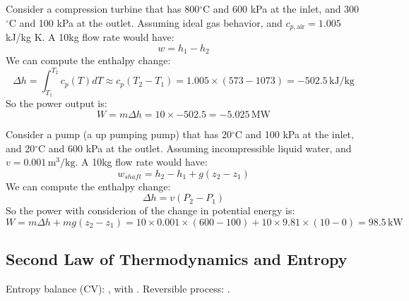 \documentclass[11pt]{report}
\begin{document}
\begin{example}
    Consider a compression turbine that has 800$^\circ$C and 600 kPa at the inlet, and 300$^\circ$C and 100 kPa at the outlet. Assuming ideal gas behavior, and $c_{p, \text{air}} = 1.005$ kJ/kg K. A 10kg flow rate would have:
    $$
        w = h_1 - h_2 
    $$
    We can compute the enthalpy change:
    $$
        \Delta h = \int_{T_1}^{T_2} c_p(T) dT \approx c_p (T_2 - T_1) = 1.005 \times (573 - 1073) = -502.5\, \text{kJ/kg}
    $$
    So the power output is:
    $$
        W = m \Delta h = 10 \times -502.5 = -5.025\, \text{MW}
    $$
\end{example}

\begin{example}
    Consider a pump (a up pumping pump) that has 20$^\circ$C and 100 kPa at the inlet, and 20$^\circ$C and 600 kPa at the outlet. Assuming incompressible liquid water, and $v = 0.001\, \text{m}^3/\text{kg}$. A 10kg flow rate would have:
    $$
        w_{shaft} = h_2 - h_1 + g(z_2 - z_1)
    $$
    We can compute the enthalpy change:
    $$
        \Delta h = v (P_2 - P_1) 
    $$
    So the power with considerion of the change in potential energy is:
    $$
        W = m \Delta h + mg(z_2 - z_1) = 10 \times 0.001 \times (600 - 100) + 10 \times 9.81 \times (10 - 0) = 98.5\, \text{kW}
    $$
\end{example}

\subsection{Second Law of Thermodynamics and Entropy}
\begin{review}
Entropy balance (CV): , with . Reversible process: .
\end{review}
\end{document}
